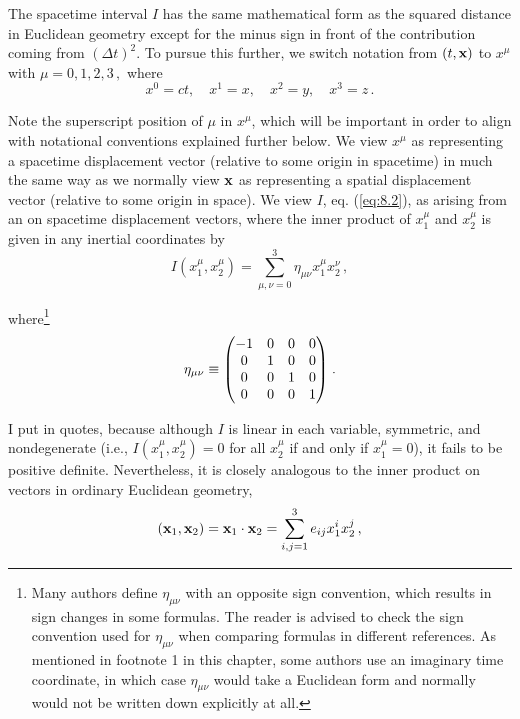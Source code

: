 The spacetime interval $I$ has the same mathematical form as the squared distance in Euclidean geometry except for the minus sign in front of the contribution coming from $(\Delta t)^2$. To pursue this further, we switch notation from $(t, \vb{x})$ to $x^\mu$ with $\mu=0, 1, 2, 3\,,$ where 
\begin{equation}\label{eq:8.5}
x^0 = ct,\quad x^1 = x,\quad x^2 = y,\quad x^3 = z\,.
\end{equation}

Note the superscript position of $\mu$ in $x^\mu$, which will be important in order to align with notational conventions explained further below. We view $x^\mu$ as representing a spacetime displacement vector (relative to some origin in spacetime) in much the same way as we normally view $\vb{x}$ as representing a spatial displacement vector (relative to some origin in space). We view $I$, eq. (\ref{eq:8.2}), as arising from an  on spacetime displacement vectors, where the inner product of $x^\mu_1$ and $x^\mu_2$ is given in any inertial coordinates by 
\begin{equation}\label{eq:8.6}
I(x^\mu_1, x^\mu_2)  = \sum_{\mu,\nu=0}^{3} \eta_{\mu \nu} x^\mu_1 x^\nu_2\,,
\end{equation}

where\footnote{Many authors define $\eta_{\mu \nu}$ with an opposite sign convention, which results in sign changes in some formulas. The reader is advised to check the sign convention used for $\eta_{\mu \nu}$ when comparing formulas in different references. As mentioned in footnote 1 in this chapter, some authors use an imaginary time coordinate, in which case $\eta_{\mu \nu}$ would take a Euclidean form and normally would not be written down explicitly at all.}
\begin{equation}\label{eq:8.7}
\eta_{\mu \nu} \equiv \mqty(-1 &0 &0 &0\\ 0 &1 &0 &0\\ 0 &0 &1 &0\\ 0 &0 &0 &1)\;.
\end{equation}

I put  in quotes, because although $I$ is linear in each variable, symmetric, and nondegenerate (i.e., $I(x^\mu_1, x^\mu_2) = 0$ for all $x^\mu_2$ if and only if $x^\mu_1 = 0$), it fails to be positive definite. Nevertheless, it is closely analogous to the inner product on vectors in ordinary Euclidean geometry, 
\begin{equation}\label{eq:8.8}
(\vb{x}_1, \vb{x}_2) = \vb{x}_1 \cdot \vb{x}_2 = \sum_{i,j=1}^3 e_{ij} x_1^i x_2^j\,,  
\end{equation}

